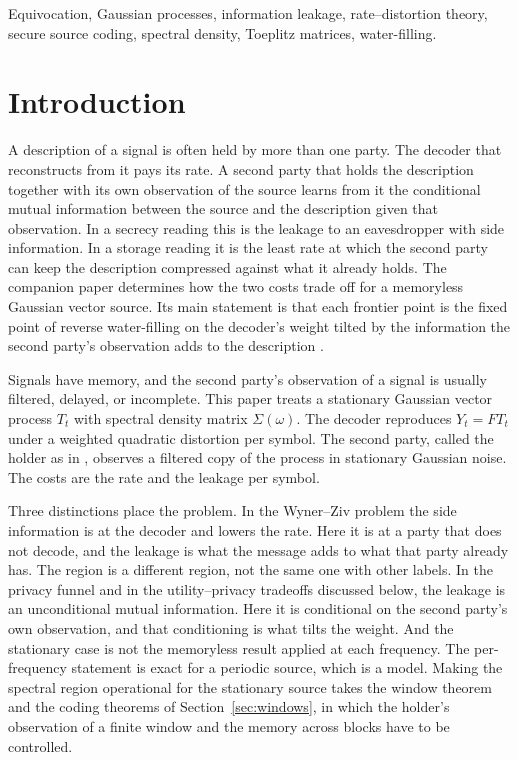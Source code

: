 \documentclass[11pt,onecolumn]{IEEEtran}
\begin{document}
\begin{IEEEkeywords}
Equivocation, Gaussian processes, information leakage, rate--distortion
theory, secure source coding, spectral density, Toeplitz matrices,
water-filling.
\end{IEEEkeywords}

\section{Introduction}
\label{sec:intro}

A description of a signal is often held by more than one party. The
decoder that reconstructs from it pays its rate. A second party that
holds the description together with its own observation of the source
learns from it the conditional mutual information between the source and
the description given that observation. In a secrecy reading this is
the leakage to an eavesdropper with side information. In a storage
reading it is the least rate at which the second party can keep the
description compressed against what it already holds. The companion
paper \cite{part1} determines how the two costs trade off for a
memoryless Gaussian vector source. Its main statement is that each
frontier point is the fixed point of reverse water-filling on the
decoder's weight tilted by the information the second party's
observation adds to the description \cite[Theorem~7]{part1}.

Signals have memory, and the second party's observation of a signal is
usually filtered, delayed, or incomplete. This paper treats a stationary
Gaussian vector process $T_t$ with spectral density matrix
$\Sigma(\omega)$. The decoder reproduces $Y_t=FT_t$ under a weighted
quadratic distortion per symbol. The second party, called the holder as
in \cite{part1}, observes a filtered copy of the process in stationary
Gaussian noise. The costs are the rate and the leakage per symbol.

Three distinctions place the problem. In the Wyner--Ziv problem the
side information is at the decoder and lowers the rate. Here it is at a
party that does not decode, and the leakage is what the message adds
to what that party already has. The region is a different region, not
the same one with other labels. In the privacy funnel and in the
utility--privacy tradeoffs discussed below, the leakage is an
unconditional mutual information. Here it is conditional on the second
party's own observation, and that conditioning is what tilts the
weight. And the stationary case is not the memoryless result applied
at each frequency. The per-frequency statement is exact for a periodic
source, which is a model. Making the spectral region operational for
the stationary source takes the window theorem and the coding theorems
of Section~\ref{sec:windows}, in which the holder's observation of a
finite window and the memory across blocks have to be controlled.
\end{document}
